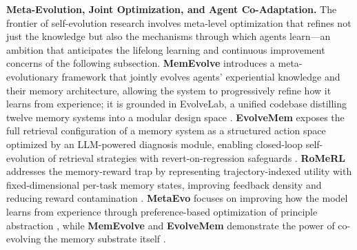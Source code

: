 \documentclass[11pt]{article}
\begin{document}
\textbf{Meta-Evolution, Joint Optimization, and Agent Co-Adaptation.} The frontier of self-evolution research involves meta-level optimization that refines not just the knowledge but also the mechanisms through which agents learn---an ambition that anticipates the lifelong learning and continuous improvement concerns of the following subsection. \textbf{MemEvolve} introduces a meta-evolutionary framework that jointly evolves agents' experiential knowledge and their memory architecture, allowing the system to progressively refine how it learns from experience; it is grounded in EvolveLab, a unified codebase distilling twelve memory systems into a modular design space \cite{ref160}. \textbf{EvolveMem} exposes the full retrieval configuration of a memory system as a structured action space optimized by an LLM-powered diagnosis module, enabling closed-loop self-evolution of retrieval strategies with revert-on-regression safeguards \cite{ref161}. \textbf{RoMeRL} addresses the memory-reward trap by representing trajectory-indexed utility with fixed-dimensional per-task memory states, improving feedback density and reducing reward contamination \cite{ref162}. \textbf{MetaEvo} focuses on improving how the model learns from experience through preference-based optimization of principle abstraction \cite{ref163}, while \textbf{MemEvolve} and \textbf{EvolveMem} demonstrate the power of co-evolving the memory substrate itself \cite{ref160,ref161}.
\end{document}
